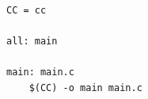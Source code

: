 \documentclass[11pt,a4paper]{article}
\begin{document}
\begin{verbatim}
CC = cc

all: main

main: main.c
	$(CC) -o main main.c
\end{verbatim}
\end{document}

